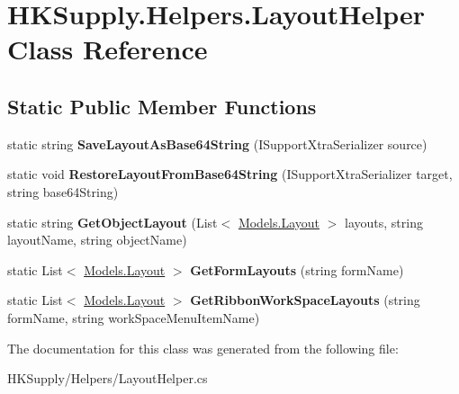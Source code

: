 \hypertarget{class_h_k_supply_1_1_helpers_1_1_layout_helper}{}\section{H\+K\+Supply.\+Helpers.\+Layout\+Helper Class Reference}
\label{class_h_k_supply_1_1_helpers_1_1_layout_helper}
\subsection*{Static Public Member Functions}
\begin{DoxyCompactItemize}
\item 
\mbox{\label{class_h_k_supply_1_1_helpers_1_1_layout_helper_a8aab6ab176fdde3718b41bbdd4233b90}} 
static string {\bfseries Save\+Layout\+As\+Base64\+String} (I\+Support\+Xtra\+Serializer source)
\item 
\mbox{\label{class_h_k_supply_1_1_helpers_1_1_layout_helper_a9dd67ec725a57e2393d94fe317f83012}} 
static void {\bfseries Restore\+Layout\+From\+Base64\+String} (I\+Support\+Xtra\+Serializer target, string base64\+String)
\item 
\mbox{\label{class_h_k_supply_1_1_helpers_1_1_layout_helper_a7c3a27f942bcd5437df58896a29193e5}} 
static string {\bfseries Get\+Object\+Layout} (List$<$ \mbox{\hyperlink{class_h_k_supply_1_1_models_1_1_layout}{Models.\+Layout}} $>$ layouts, string layout\+Name, string object\+Name)
\item 
\mbox{\label{class_h_k_supply_1_1_helpers_1_1_layout_helper_aabd67a28876fd81eda4590fa45baceb8}} 
static List$<$ \mbox{\hyperlink{class_h_k_supply_1_1_models_1_1_layout}{Models.\+Layout}} $>$ {\bfseries Get\+Form\+Layouts} (string form\+Name)
\item 
\mbox{\label{class_h_k_supply_1_1_helpers_1_1_layout_helper_a703dd3e51d59798c145c69a5e1a9c455}} 
static List$<$ \mbox{\hyperlink{class_h_k_supply_1_1_models_1_1_layout}{Models.\+Layout}} $>$ {\bfseries Get\+Ribbon\+Work\+Space\+Layouts} (string form\+Name, string work\+Space\+Menu\+Item\+Name)
\end{DoxyCompactItemize}


The documentation for this class was generated from the following file\+:\begin{DoxyCompactItemize}
\item 
H\+K\+Supply/\+Helpers/Layout\+Helper.\+cs\end{DoxyCompactItemize}

